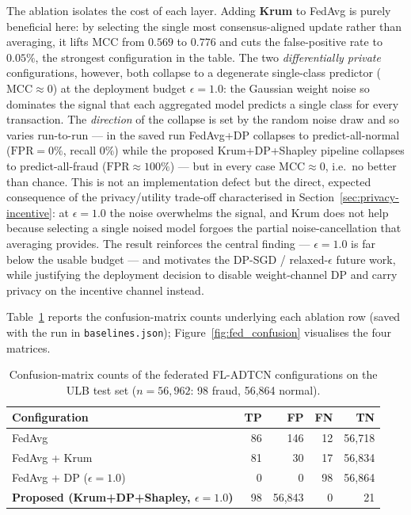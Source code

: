 The ablation isolates the cost of each layer. Adding \textbf{Krum} to FedAvg is purely beneficial here: by selecting the single most consensus-aligned update rather than averaging, it lifts MCC from $0.569$ to $0.776$ and cuts the false-positive rate to $0.05\%$, the strongest configuration in the table. The two \emph{differentially private} configurations, however, both collapse to a degenerate single-class predictor ($\text{MCC}\approx 0$) at the deployment budget $\epsilon=1.0$: the Gaussian weight noise so dominates the signal that each aggregated model predicts a single class for every transaction. The \emph{direction} of the collapse is set by the random noise draw and so varies run-to-run --- in the saved run FedAvg+DP collapses to predict-all-normal ($\text{FPR}=0\%$, recall $0\%$) while the proposed Krum+DP+Shapley pipeline collapses to predict-all-fraud ($\text{FPR}\approx 100\%$) --- but in every case $\text{MCC}\approx 0$, i.e.\ no better than chance. This is not an implementation defect but the direct, expected consequence of the privacy/utility trade-off characterised in Section~\ref{sec:privacy-incentive}: at $\epsilon=1.0$ the noise overwhelms the signal, and Krum does not help because selecting a single noised model forgoes the partial noise-cancellation that averaging provides. The result reinforces the central finding --- $\epsilon=1.0$ is far below the usable budget --- and motivates the DP-SGD / relaxed-$\epsilon$ future work, while justifying the deployment decision to disable weight-channel DP and carry privacy on the incentive channel instead.

Table~\ref{tab:fed_confusion} reports the confusion-matrix counts underlying each ablation row (saved with the run in \texttt{baselines.json}); Figure~\ref{fig:fed_confusion} visualises the four matrices.

\begin{table}[H]
\centering
\caption{Confusion-matrix counts of the federated FL-ADTCN configurations on the ULB test set ($n=56{,}962$: 98 fraud, 56{,}864 normal).}
\label{tab:fed_confusion}
\begin{tabular}{|p{5.4cm}|r|r|r|r|}
\hline \textbf{Configuration} & \textbf{TP} & \textbf{FP} & \textbf{FN} & \textbf{TN} \\ \hline
FedAvg                         & 86 & 146      & 12 & 56{,}718 \\ \hline
FedAvg + Krum                  & 81 & 30       & 17 & 56{,}834 \\ \hline
FedAvg + DP ($\epsilon=1.0$)   & 0  & 0        & 98 & 56{,}864 \\ \hline
\textbf{Proposed (Krum+DP+Shapley, $\epsilon=1.0$)} & 98 & 56{,}843 & 0 & 21 \\ \hline
\end{tabular}
\end{table}

